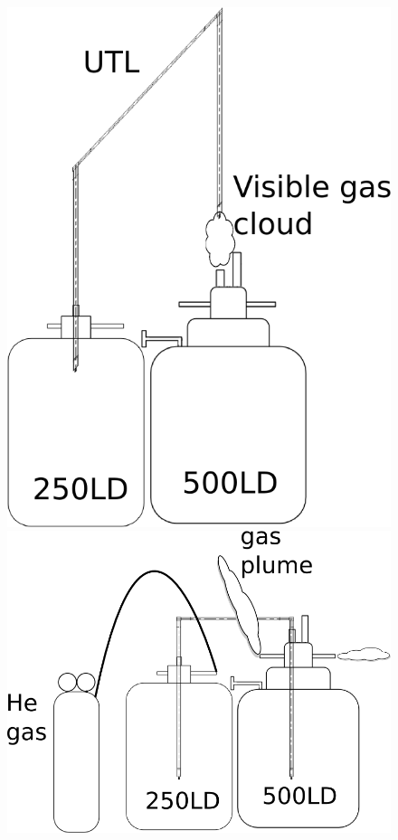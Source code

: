 \begin{figure}[htbp!]
 \begin{minipage}{.38\textwidth}
 \includegraphics[width=\textwidth]{./img/500LDfill-03-insert-UTL-in-250LD.png}
 \end{minipage}
  \quad
 \begin{minipage}{.58\textwidth}
 \includegraphics[width=\textwidth]{./img/500LDfill-04-insert-UTL-in-500LD.png}

\end{minipage}
\end{figure}
